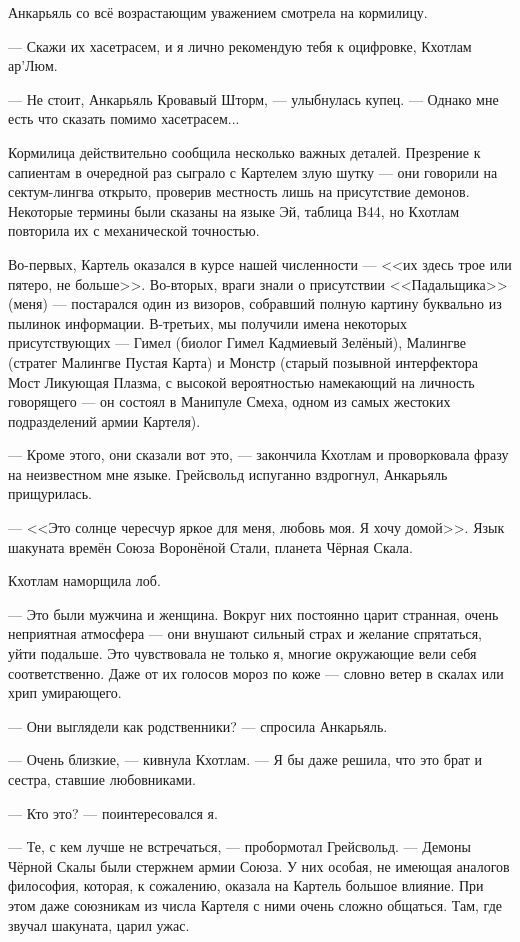 Анкарьяль со всё возрастающим уважением смотрела на кормилицу.

--- Скажи их хасетрасем, и я лично рекомендую тебя к оцифровке, Кхотлам ар'Люм.

--- Не стоит, Анкарьяль Кровавый Шторм, --- улыбнулась купец.
--- Однако мне есть что сказать помимо хасетрасем...

\asterism

Кормилица действительно сообщила несколько важных деталей.
Презрение к сапиентам в очередной раз сыграло с Картелем злую шутку --- они говорили на сектум-лингва открыто, проверив местность лишь на присутствие демонов.
Некоторые термины были сказаны на языке Эй, таблица B44, но Кхотлам повторила их с механической точностью.

Во-первых, Картель оказался в курсе нашей численности --- <<их здесь трое или пятеро, не больше>>.
Во-вторых, враги знали о присутствии <<Падальщика>> (меня) --- постарался один из визоров, собравший полную картину буквально из пылинок информации.
В-третьих, мы получили имена некоторых присутствующих --- Гимел (биолог Гимел Кадмиевый Зелёный), Малингве (стратег Малингве Пустая Карта) и Монстр (старый позывной интерфектора Мост Ликующая Плазма, с высокой вероятностью намекающий на личность говорящего --- он состоял в Манипуле Смеха, одном из самых жестоких подразделений армии Картеля).

--- Кроме этого, они сказали вот это, --- закончила Кхотлам и проворковала фразу на неизвестном мне языке.
Грейсвольд испуганно вздрогнул, Анкарьяль прищурилась.

--- <<Это солнце чересчур яркое для меня, любовь моя.
Я хочу домой>>.
Язык шакуната времён Союза Воронёной Стали, планета Чёрная Скала.

Кхотлам наморщила лоб.

--- Это были мужчина и женщина.
Вокруг них постоянно царит странная, очень неприятная атмосфера --- они внушают сильный страх и желание спрятаться, уйти подальше.
Это чувствовала не только я, многие окружающие вели себя соответственно.
Даже от их голосов мороз по коже --- словно ветер в скалах или хрип умирающего.

--- Они выглядели как родственники? --- спросила Анкарьяль.

--- Очень близкие, --- кивнула Кхотлам.
--- Я бы даже решила, что это брат и сестра, ставшие любовниками.

--- Кто это? --- поинтересовался я.

--- Те, с кем лучше не встречаться, --- пробормотал Грейсвольд.
--- Демоны Чёрной Скалы были стержнем армии Союза.
У них особая, не имеющая аналогов философия, которая, к сожалению, оказала на Картель большое влияние.
При этом даже союзникам из числа Картеля с ними очень сложно общаться.
Там, где звучал шакуната, царил ужас.

